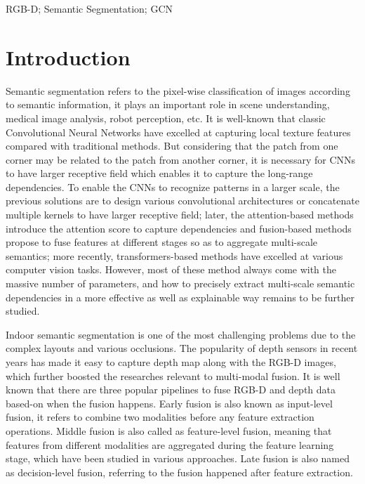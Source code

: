 ﻿\documentclass[journal]{IEEEtran}
\begin{document}
\begin{IEEEkeywords}
    RGB-D; Semantic Segmentation; GCN
    \end{IEEEkeywords}


\section{Introduction} \label{sec_introduction}
 
    Semantic segmentation refers to the pixel-wise classification of images according to semantic information, it plays an important role in scene understanding, medical image analysis, robot perception, etc\cite{mo2022review}. It is well-known that classic Convolutional Neural Networks \cite{krizhevsky2017alexnet} have excelled at capturing local texture features compared with traditional methods. But considering that the patch from one corner may be related to the patch from another corner, it is necessary for CNNs to have larger receptive field which enables it to capture the long-range dependencies. To enable the CNNs to recognize patterns in a larger scale, the previous solutions are to design various convolutional architectures \cite{wei2018dilated} or concatenate multiple kernels \cite{simonyan2014vgg} to have larger receptive field; later, the attention-based methods \cite{hu2018seNet} \cite{wang2018nonLocal} introduce the attention score to capture dependencies and fusion-based methods \cite{yuan2020OCrep} \cite{li2020gatedfuse} propose to fuse features at different stages so as to aggregate multi-scale semantics; more recently, transformers-based methods \cite{carion2020DETR}\cite{dosovitskiy2020ViT} have excelled at various computer vision tasks. However, most of these method always come with the massive number of parameters, and how to precisely extract multi-scale semantic dependencies in a more effective as well as explainable way remains to be further studied. 
    
    Indoor semantic segmentation is one of the most challenging problems due to the complex layouts and various occlusions\cite{wang2021brief}. The popularity of depth sensors in recent years has made it easy to capture depth map along with the RGB-D images, which further boosted the researches relevant to multi-modal fusion. It is well known that there are three popular pipelines to fuse RGB-D and depth data based-on when the fusion happens. Early fusion is also known as input-level fusion, it refers to combine two modalities before any feature extraction operations. Middle fusion is also called as feature-level fusion, meaning that features from different modalities are aggregated during the feature learning stage, which have been studied in various approaches. Late fusion is also named as decision-level fusion, referring to the fusion happened after feature extraction. 
\end{document}

